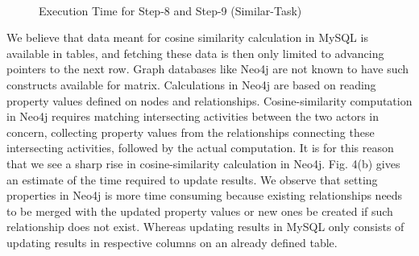 \documentclass[11pt]{article}
\begin{document}
{{%



\begin{figure}
  \centering
  \mbox{
    \quad
    }
  \caption{Execution Time for Step-8 and Step-9 (Similar-Task)}
\end{figure}
\par{We believe that data meant for cosine similarity calculation in MySQL is available in tables, and fetching these data is then only limited to advancing pointers to the next row. Graph databases like Neo4j are not known to have such constructs available for matrix. Calculations in Neo4j are based on reading property values defined on nodes and relationships. Cosine-similarity computation in Neo4j requires matching intersecting activities between the two actors in concern, collecting property values from the relationships connecting these intersecting activities, followed by the actual computation. It is for this reason that we see a sharp rise in cosine-similarity calculation in Neo4j. Fig. 4(b) gives an estimate of the time required to update results. We observe that setting properties in Neo4j is more time consuming because existing relationships needs to be merged with the updated property values or new ones be created if such relationship does not exist. Whereas updating results in MySQL only consists of updating results in respective columns on an already defined table.}


}}
\end{document}
